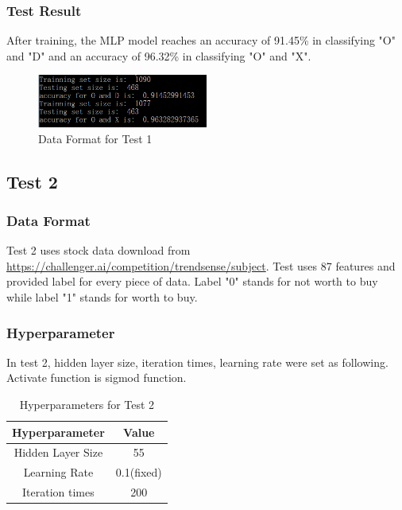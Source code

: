 \documentclass[letterpaper]{article}
\begin{document}
\subsubsection{Test Result}
After training, the MLP model reaches an accuracy of 91.45\% in classifying "O" and "D" and an accuracy of 96.32\% in classifying "O" and "X".
\begin{figure}[H]
\centering
\includegraphics[width=0.5\textwidth]{res1.png}
\caption{\label{fig:frog}Data Format for Test 1}
\end{figure}
\subsection{Test 2}
\subsubsection{Data Format}
Test 2 uses stock data download from \url{https://challenger.ai/competition/trendsense/subject}. Test uses 87 features and provided label for every piece of data. Label "0" stands for not worth to buy while label "1" stands for worth to buy.
\subsubsection{Hyperparameter}
In test 2, hidden layer size, iteration times, learning rate were set as following. Activate function is sigmod function.
\begin{table}[H]
\centering
\begin{tabular}{|c|c|}
 \hline
Hyperparameter& Value \\
 \hline
Hidden Layer Size & 55   \\
 \hline
Learning Rate& 0.1(fixed)\\
  \hline
Iteration times & 200\\
\hline
\end{tabular}\\
\caption{\label{tab:widgets}Hyperparameters for Test 2}
\end{table}
\end{document}
